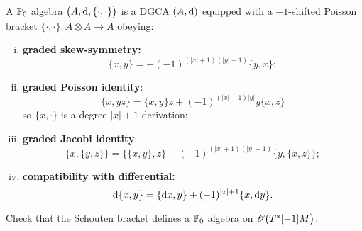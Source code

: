 \begin{definition}
  A $\mathbb{P}_0$ algebra $\bigl( A, \mathrm{d}, \{ \cdot, \cdot \} \bigr)$ is a DGCA $(A, \mathrm{d})$ equipped with a $-1$-shifted Poisson bracket $\{ \cdot, \cdot \}: A \otimes A \rightarrow A$ obeying:
  \begin{enumerate}[i)]
    \item \textbf{graded skew-symmetry:}
      \begin{equation*}
        \{x, y\} = - (-1)^{(|x|+1)(|y|+1)} \{y, x\};
      \end{equation*}
    \item \textbf{graded Poisson identity}:
      \begin{equation*}
        \{x, yz \} = \{x, y\} z + (-1)^{(|x|+1)|y|} y \{x, z\}
      \end{equation*}
      so $\{x, \cdot \}$ is a degree $|x|+1$ derivation;
    \item \textbf{graded Jacobi identity}:
      \begin{equation*}
        \{x, \{y, z\} \} = \{ \{x, y\}, z \} + (-1)^{(|x|+1)(|y|+1)} \{y, \{x, z\} \};
      \end{equation*}
    \item \textbf{compatibility with differential:}
      \begin{equation*}
        \mathrm{d} \{x, y\} = \{ \mathrm{d} x, y \} + (-1)^{|x|+1} \{x, \mathrm{d} y \}.
      \end{equation*}
  \end{enumerate}
\end{definition}

\begin{exercise}
  Check that the Schouten bracket defines a $\mathbb{P}_0$ algebra on $\mathscr{O}\bigl(T^*[-1] M \bigr)$.
\end{exercise}
